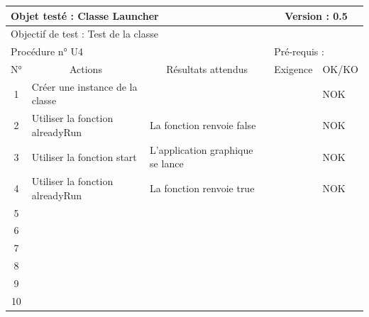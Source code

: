 \documentclass{../res/univ-projet}
\begin{document}
\begin{center}
    \begin{tabular}{|c|p{5cm}|p{5cm}|p{1.5cm}|p{1.5cm}|}
      \hline
      \multicolumn{3}{|l|}{Objet testé : Classe Launcher} & \multicolumn{2}{c|}{Version : 0.5}\\ \hline
      \multicolumn{5}{|l|}{Objectif de test : Test de la classe}\\ \hline
      \multicolumn{3}{|l|}{Procédure n° U4} & \multicolumn{2}{p{3cm}|}{Pré-requis : }\\ \hline
      \multicolumn{1}{|c|}{N°} & \multicolumn{1}{c|}{Actions} & \multicolumn{1}{c|}{Résultats attendus} & 
      \multicolumn{1}{c|}{Exigence} & \multicolumn{1}{c|}{OK/KO}\\ \hline
      1 & Créer une instance de la classe &  &  & NOK \\
      2 & Utiliser la fonction alreadyRun & La fonction renvoie false &  & NOK \\
      3 & Utiliser la fonction start & L'application graphique se lance &  & NOK \\
      4 & Utiliser la fonction alreadyRun & La fonction renvoie true &  & NOK \\
      5 &  &  &  & \\
	    6 &  &  &  & \\
      7 &  &  &  & \\
      8 &  &  &  & \\
      9 &  &  &  & \\
      10 &  &  &  &\\ 
	\hline
    \end{tabular}
    \vskip 2.2cm
    

\end{center}
\end{document}
